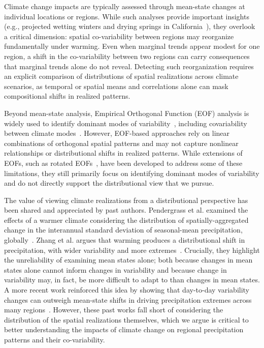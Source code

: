 Climate change impacts are typically assessed through mean-state changes at individual locations or regions.
%
While such analyses provide important insights (e.g., projected wetting winters and drying springs in California~\cite{pierce2018climate,polade2017precipitation}), they overlook a critical dimension: spatial co-variability between regions may reorganize fundamentally under warming.
%
Even when marginal trends appear modest for one region, a shift in the co-variability between two regions can carry consequences that marginal trends alone do not reveal.
%
Detecting such reorganization requires an explicit comparison of distributions of spatial realizations across climate scenarios, as temporal or spatial means and correlations alone can mask compositional shifts in realized patterns.

Beyond mean-state analysis, Empirical Orthogonal Function (EOF) analysis is widely used to identify dominant modes of variability~\cite{hannachi2007empirical}, including covariability between climate modes~\cite{boschat2026covariability}. However, EOF-based approaches rely on linear combinations of orthogonal spatial patterns and may not capture nonlinear relationships or distributional shifts in realized patterns.
%
While extensions of EOFs, such as rotated EOFs~\cite{lian_evaluation_2012}, have been developed to address some of these limitations, they still primarily focus on identifying dominant modes of variability and do not directly support the distributional view that we pursue.

The value of viewing climate realizations from a distributional perspective has been shared and appreciated by past authors.
%
Pendergrass et al. examined the effects of a warmer climate considering the distribution of spatially-aggregated change in the interannual standard deviation of seasonal-mean precipitation, globally~\cite{pendergrass_precipitation_2017}.
%
Zhang et al. argues that warming produces a distributional shift in precipitation, with wider variability and more extremes~\cite{zhang_increasing_2021}.
%
Crucially, they highlight the unreliability of examining mean states alone; both because changes in mean states alone cannot inform changes in variability and because change in variability may, in fact, be more difficult to adapt to than changes in mean states.
%
A more recent work reinforced this idea by showing that day-to-day variability changes can outweigh mean-state shifts in driving precipitation extremes across many regions~\cite{nordling2025climate}.
%
However, these past works fall short of considering the distribution of the spatial realizations themselves, which we argue is critical to better understanding the impacts of climate change on regional precipitation patterns and their co-variability.

